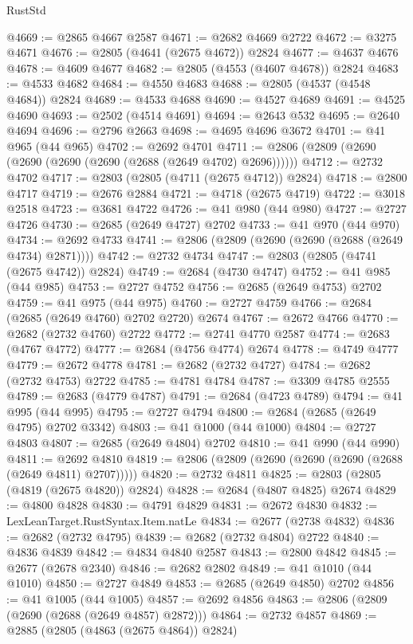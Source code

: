 \begin{lexlean}{RustStd}
\begin{coremodule}
@4669 := @2865 @4667 @2587
@4671 := @2682 @4669 @2722
@4672 := @3275 @4671
@4676 := @2805 (@4641 (@2675 @4672)) @2824
@4677 := @4637 @4676
@4678 := @4609 @4677
@4682 := @2805 (@4553 (@4607 @4678)) @2824
@4683 := @4533 @4682
@4684 := @4550 @4683
@4688 := @2805 (@4537 (@4548 @4684)) @2824
@4689 := @4533 @4688
@4690 := @4527 @4689
@4691 := @4525 @4690
@4693 := @2502 (@4514 @4691)
@4694 := @2643 @532
@4695 := @2640 @4694
@4696 := @2796 @2663
@4698 := @4695 @4696 @3672
@4701 := @41 @965 (@44 @965)
@4702 := @2692 @4701
@4711 := @2806 (@2809 (@2690 (@2690 (@2690 (@2690 (@2688 (@2649 @4702) @2696))))))
@4712 := @2732 @4702
@4717 := @2803 (@2805 (@4711 (@2675 @4712)) @2824)
@4718 := @2800 @4717
@4719 := @2676 @2884
@4721 := @4718 (@2675 @4719)
@4722 := @3018 @2518
@4723 := @3681 @4722
@4726 := @41 @980 (@44 @980)
@4727 := @2727 @4726
@4730 := @2685 (@2649 @4727) @2702
@4733 := @41 @970 (@44 @970)
@4734 := @2692 @4733
@4741 := @2806 (@2809 (@2690 (@2690 (@2688 (@2649 @4734) @2871))))
@4742 := @2732 @4734
@4747 := @2803 (@2805 (@4741 (@2675 @4742)) @2824)
@4749 := @2684 (@4730 @4747)
@4752 := @41 @985 (@44 @985)
@4753 := @2727 @4752
@4756 := @2685 (@2649 @4753) @2702
@4759 := @41 @975 (@44 @975)
@4760 := @2727 @4759
@4766 := @2684 (@2685 (@2649 @4760) @2702 @2720) @2674
@4767 := @2672 @4766
@4770 := @2682 (@2732 @4760) @2722
@4772 := @2741 @4770 @2587
@4774 := @2683 (@4767 @4772)
@4777 := @2684 (@4756 @4774) @2674
@4778 := @4749 @4777
@4779 := @2672 @4778
@4781 := @2682 (@2732 @4727)
@4784 := @2682 (@2732 @4753) @2722
@4785 := @4781 @4784
@4787 := @3309 @4785 @2555
@4789 := @2683 (@4779 @4787)
@4791 := @2684 (@4723 @4789)
@4794 := @41 @995 (@44 @995)
@4795 := @2727 @4794
@4800 := @2684 (@2685 (@2649 @4795) @2702 @3342)
@4803 := @41 @1000 (@44 @1000)
@4804 := @2727 @4803
@4807 := @2685 (@2649 @4804) @2702
@4810 := @41 @990 (@44 @990)
@4811 := @2692 @4810
@4819 := @2806 (@2809 (@2690 (@2690 (@2690 (@2688 (@2649 @4811) @2707)))))
@4820 := @2732 @4811
@4825 := @2803 (@2805 (@4819 (@2675 @4820)) @2824)
@4828 := @2684 (@4807 @4825) @2674
@4829 := @4800 @4828
@4830 := @4791 @4829
@4831 := @2672 @4830
@4832 := LexLeanTarget.RustSyntax.Item.natLe
@4834 := @2677 (@2738 @4832)
@4836 := @2682 (@2732 @4795)
@4839 := @2682 (@2732 @4804) @2722
@4840 := @4836 @4839
@4842 := @4834 @4840 @2587
@4843 := @2800 @4842
@4845 := @2677 (@2678 @2340)
@4846 := @2682 @2802
@4849 := @41 @1010 (@44 @1010)
@4850 := @2727 @4849
@4853 := @2685 (@2649 @4850) @2702
@4856 := @41 @1005 (@44 @1005)
@4857 := @2692 @4856
@4863 := @2806 (@2809 (@2690 (@2688 (@2649 @4857) @2872)))
@4864 := @2732 @4857
@4869 := @2885 (@2805 (@4863 (@2675 @4864)) @2824)

\end{coremodule}
\end{lexlean}

